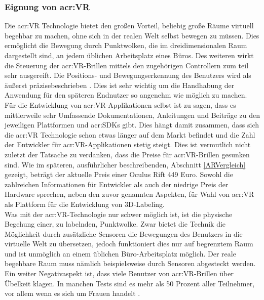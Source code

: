 \subsubsection{Eignung von \acrlong{acr:VR}} 

Die \acrlong{acr:VR} Technologie bietet den großen Vorteil, beliebig große Räume virtuell begehbar zu machen, ohne sich in der realen Welt selbst bewegen zu müssen. Dies ermöglicht die Bewegung durch Punktwolken, die im dreidimensionalen Raum dargestellt sind, an jedem üblichen Arbeitsplatz eines Büros. Des weiteren wirkt die Steuerung der \acrshort{acr:VR}-Brillen mittels den zugehörigen Controllern zum teil sehr ausgereift. Die Positions- und Bewegungserkennung des Benutzers wird als \glqq äußerst präzise\grqq beschrieben \cite{ControllerTest}. Dies ist sehr wichtig um die Handhabung der Anwendung für den späteren Endnutzer so angenehm wie möglich zu machen. Für die Entwicklung von \acrshort{acr:VR}-Applikationen selbst ist zu sagen, dass es mittlerweile sehr Umfassende Dokumentationen, Anleitungen und Beiträge zu den jeweiligen Plattformen und \glspl{acr:SDK} gibt. Dies hängt damit zusammen, dass sich die \acrlong{acr:VR} Technologie schon etwas länger auf dem Markt befindet und die Zahl der Entwickler für \acrshort{acr:VR}-Applikationen stetig steigt. Dies ist vermutlich nicht zuletzt der Tatsache zu verdanken, dass die Preise für \acrshort{acr:VR}-Brillen gesunken sind. Wie im späteren, ausführlicher beschreibenden, Abschnitt \ref{ARVergleich} gezeigt, beträgt der aktuelle Preis einer Oculus Rift 449 Euro. Sowohl die zahlreichen Informationen für Entwickler als auch der niedrige Preis der Hardware sprechen, neben den zuvor genannten Aspekten, für Wahl von \acrlong{acr:VR} als Plattform für die Entwicklung von 3D-Labeling.\\

Was mit der \acrshort{acr:VR}-Technologie nur schwer möglich ist, ist die physische Begehung einer, zu labelnden, Punktwolke. Zwar bietet die Technik die Möglichkeit durch zusätzliche Sensoren die Bewegungen des Benutzers in die virtuelle Welt zu übersetzen, jedoch funktioniert dies nur auf begrenztem Raum und ist unmöglich an einem üblichen Büro-Arbeitsplatz möglich. Der reale begehbare Raum muss nämlich beispielsweise durch Sensoren abgesteckt werden. Ein weiter Negativaspekt ist, dass viele Benutzer von \acrshort{acr:VR}-Brillen über Übelkeit klagen. In manchen Tests sind es mehr als 50 Prozent aller Teilnehmer, vor allem wenn es sich um Frauen handelt \cite{VRSickness}. 


